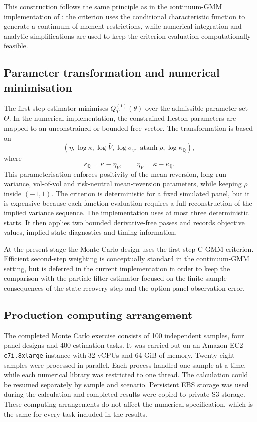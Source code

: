 \documentclass[11pt,a4paper,notitlepage]{article}
\numberwithin{equation}{section}
\begin{document}
This construction follows the same principle as in the continuum-GMM implementation of \citet{boswijk2015asset}: the criterion uses the conditional characteristic function to generate a continuum of moment restrictions, while numerical integration and analytic simplifications are used to keep the criterion evaluation computationally feasible.

\subsection{Parameter transformation and numerical minimisation}

The first-step estimator minimises \(Q_T^{(1)}(\theta)\) over the admissible parameter set \(\Theta\). In the numerical implementation, the constrained Heston parameters are mapped to an unconstrained or bounded free vector. The transformation is based on
\[
\left(
\eta,
\log\kappa,
\log\bar V,
\log\sigma_v,
\operatorname{atanh}\rho,
\log\kappa_{\mathbb Q}
\right),
\]
where
\[
\kappa_{\mathbb Q}=\kappa-\eta_V,
\qquad
\eta_V=\kappa-\kappa_{\mathbb Q}.
\]
This parameterisation enforces positivity of the mean-reversion, long-run variance, vol-of-vol and risk-neutral mean-reversion parameters, while keeping \(\rho\) inside \((-1,1)\). The criterion is deterministic for a fixed simulated panel, but it is expensive because each function evaluation requires a full reconstruction of the implied variance sequence. The implementation uses at most three deterministic starts. It then applies two bounded derivative-free passes and records objective values, implied-state diagnostics and timing information.

At the present stage the Monte Carlo design uses the first-step C-GMM criterion. Efficient second-step weighting is conceptually standard in the continuum-GMM setting, but is deferred in the current implementation in order to keep the comparison with the particle-filter estimator focused on the finite-sample consequences of the state recovery step and the option-panel observation error.

\subsection{Production computing arrangement}

The completed Monte Carlo exercise consists of 100 independent samples, four panel designs and 400 estimation tasks. It was carried out on an Amazon EC2 \texttt{c7i.8xlarge} instance with 32 vCPUs and 64 GiB of memory. Twenty-eight samples were processed in parallel. Each process handled one sample at a time, while each numerical library was restricted to one thread. The calculation could be resumed separately by sample and scenario. Persistent EBS storage was used during the calculation and completed results were copied to private S3 storage. These computing arrangements do not affect the numerical specification, which is the same for every task included in the results.


\newpage


\nocite{*}

\end{document}
